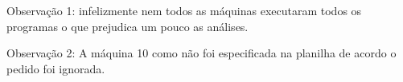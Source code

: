 \documentclass[10pt,a4paper]{article}
\begin{document}
Observação 1: infelizmente nem todos as máquinas executaram todos os
programas o que prejudica um pouco as análises. 

Observação 2: A máquina 10 como não
foi especificada na planilha de acordo o pedido foi ignorada.

%
%  
\end{document}

